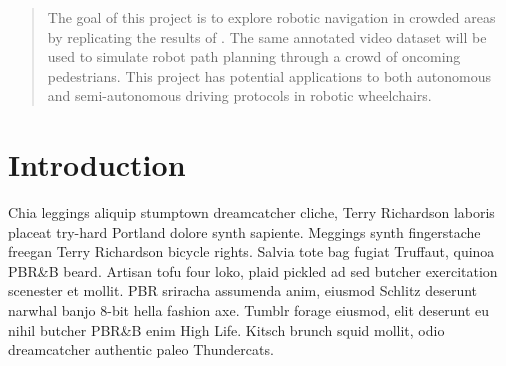 \documentclass[a4paper,11pt,headings=small]{article}
\begin{document}


\pagestyle{fancy}
\fancyhf{}

\setcounter{page}{1}

\onehalfspacing
\renewcommand{\thesection}{\Roman{section}}
\thispagestyle{empty}


\begin{abstract}
The goal of this project is to explore robotic navigation in crowded areas by replicating the results of \cite{Trautman2010}. The same annotated video dataset will be used to simulate robot path planning through a crowd of oncoming pedestrians. This project has potential applications to both autonomous and semi-autonomous driving protocols in robotic wheelchairs.
\end{abstract}


\section*{Introduction}
\quad Chia leggings aliquip stumptown dreamcatcher cliche, Terry Richardson laboris placeat try-hard Portland dolore synth sapiente. Meggings synth fingerstache freegan Terry Richardson bicycle rights. Salvia tote bag fugiat Truffaut, quinoa PBR\&B beard. Artisan tofu four loko, plaid pickled ad sed butcher exercitation scenester et mollit. PBR sriracha assumenda anim, eiusmod Schlitz deserunt narwhal banjo 8-bit hella fashion axe. Tumblr forage eiusmod, elit deserunt eu nihil butcher PBR\&B enim High Life. Kitsch brunch squid mollit, odio dreamcatcher authentic paleo Thundercats.
\end{document}

